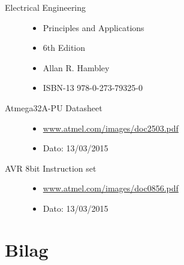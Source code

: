 \begin{description}
	\item[Electrical Engineering] \hfill
		\begin{itemize}
			\item Principles and Applications
			\item 6th Edition
			\item Allan R. Hambley
			\item ISBN-13 978-0-273-79325-0
		\end{itemize}
	\item[Atmega32A-PU Datasheet] \hfill
		\begin{itemize}
			\item \url{www.atmel.com/images/doc2503.pdf}
			\item Dato: 13/03/2015
		\end{itemize}
	\item[AVR 8bit Instruction set] \hfill
		\begin{itemize}
			\item \url{www.atmel.com/images/doc0856.pdf}
			\item Dato: 13/03/2015
		\end{itemize}
\end{description}

\section{Bilag}

